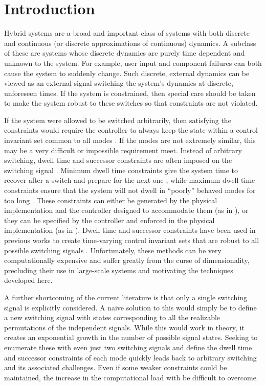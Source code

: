 \section{Introduction}
Hybrid systems are a broad and important class of systems with both discrete and continuous (or discrete approximations of continuous) dynamics. A subclass of these are systems whose discrete dynamics are purely time dependent and unknown to the system. For example, user input and component failures can both cause the system to suddenly change. Such discrete, external dynamics can be viewed as an external signal switching the system's dynamics at discrete, unforeseen times. If the system is constrained, then special care should be taken to make the system robust to these switches so that constraints are not violated. 

If the system were allowed to be switched arbitrarily, then satisfying the constraints would require the controller to always keep the state within a control invariant set common to all modes \cite{Liberzon1999}. If the modes are not extremely similar, this may be a very difficult or impossible requirement meet. Instead of arbitrary switching, dwell time and successor constraints are often imposed on the switching signal \cite{Liberzon1999,Morse1999}. Minimum dwell time constraints give the system time to recover after a switch and prepare for the next one \cite{Danielson2019}, while maximum dwell time constraints ensure that the system will not dwell in ``poorly'' behaved modes for too long \cite{Hall2022}. These constraints can either be generated by the physical implementation and the controller designed to accommodate them (as in \cite{Danielson2019}), or they can be specified by the controller and enforced in the physical implementation (as in \cite{Zhang2016}). Dwell time and successor constraints have been used in previous works to create time-varying control invariant sets that are robust to all possible switching signals \cite{Danielson2019}. Unfortunately, these methods can be very computationally expensive and suffer greatly from the curse of dimensionality, precluding their use in large-scale systems and motivating the techniques developed here.

A further shortcoming of the current literature is that only a single switching signal is explicitly considered. A naive solution to this would simply be to define a new switching signal with states corresponding to all the realizable permutations of the independent signals. While this would work in theory, it creates an exponential growth in the number of possible signal states. Seeking to enumerate these with even just two switching signals and define the dwell time and successor constraints of each mode quickly leads back to arbitrary switching and its associated challenges. Even if some weaker constraints could be maintained, the increase in the computational load with be difficult to overcome.

